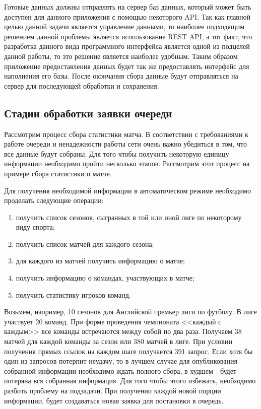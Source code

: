 Готовые данных должны отправлять на сервер баз данных, который может быть доступен для данного приложения с помощью некоторого API. Так как главной целью данной задачи является управление данными, то наиболее подходящим решением данной проблемы является использование REST API, а тот факт, что разработка данного вида программного интерфейса является одной из подцелей данной работы, то это решение является наиболее удобным. Таким образом приложение предоставления данных будет так же предоставлять интерфейс для наполнения его базы. После окончания сбора данные будут отправляться на сервер для последующей обработки и сохранения.

\subsection{Стадии обработки заявки очереди}
Рассмотрим процесс сбора статистики матча. В соответствии с требованиями к работе очереди и ненадежности работы сети очень важно убедиться в том, что все данные будут собраны. Для того чтобы получить некоторую единицу информации необходимо пройти несколько этапов. Рассмотрим этот процесс на примере сбора статистики о матче. 

Для получения необходимой информации в автоматическом режиме необходимо проделать следующие операции:
\begin{enumerate}
\item получить список сезонов, сыгранных в той или иной лиге по некоторому виду спорта;
\item получить список матчей для каждого сезона;
\item для каждого из матчей получить информацию о матче;
\item получить информацию о командах, участвующих в матче;
\item получить статистику игроков команд.
\end{enumerate}
Возьмем, например, 10 сезонов для Английской премьер лиги по футболу. В лиге участвует 20 команд. При форме проведения чемпионата <<каждый с каждым>> все команды встречаются между собой по два раза. Получаем 38 матчей для каждой команды за сезон или 380 матчей в лиге. При условии получения прямых ссылок на каждом шаге получается 391 запрос. Если хотя бы один из запросов потерпит неудачу, то в лучшем случае для опубликования собранной информации необходимо ждать полного сбора, в худшем - будет потеряна вся собранная информация.
Для того чтобы этого избежать, необходимо разбить проблему на подзадачи. При получении каждой новой порции информации, будет создаваться новая заявка для постановки в очередь. 

